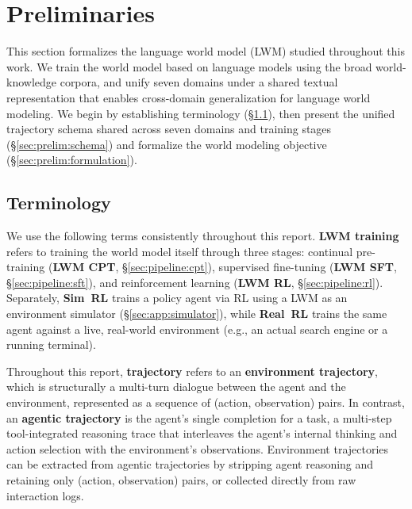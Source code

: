 \section{Preliminaries}
\label{sec:prelim}

This section formalizes the language world model (LWM) studied throughout this work.
We train the world model based on language models using the broad world-knowledge corpora, and unify seven domains under a shared textual representation that enables cross-domain generalization for language world modeling.
We begin by establishing terminology (\S\ref{sec:prelim:terminology}), then present the unified trajectory schema shared across seven domains and training stages (\S\ref{sec:prelim:schema}) and formalize the world modeling objective (\S\ref{sec:prelim:formulation}).

\subsection{Terminology}
\label{sec:prelim:terminology}

We use the following terms consistently throughout this report.
\textbf{LWM training} refers to training the world model itself through three stages: continual pre-training (\textbf{LWM CPT}, \S\ref{sec:pipeline:cpt}), supervised fine-tuning (\textbf{LWM SFT}, \S\ref{sec:pipeline:sft}), and reinforcement learning (\textbf{LWM RL}, \S\ref{sec:pipeline:rl}).
Separately, \textbf{Sim~RL} trains a policy agent via RL using a LWM as an environment simulator (\S\ref{sec:app:simulator}), while \textbf{Real~RL} trains the same agent against a live, real-world environment (e.g., an actual search engine or a running terminal).

Throughout this report, \textbf{trajectory} refers to an \textbf{environment trajectory}, which is structurally a multi-turn dialogue between the agent and the environment, represented as a sequence of (action, observation) pairs.
In contrast, an \textbf{agentic trajectory} is the agent's single completion for a task, a multi-step tool-integrated reasoning trace that interleaves the agent's internal thinking and action selection with the environment's observations.
Environment trajectories can be extracted from agentic trajectories by stripping agent reasoning and retaining only (action, observation) pairs, or collected directly from raw interaction logs.


